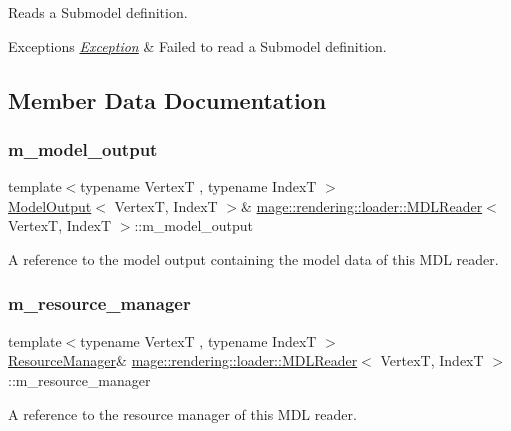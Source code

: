Reads a Submodel definition.


\begin{DoxyExceptions}{Exceptions}
{\em \mbox{\hyperlink{classmage_1_1_exception}{Exception}}} & Failed to read a Submodel definition. \\
\hline
\end{DoxyExceptions}


\subsection{Member Data Documentation}
\mbox{\label{classmage_1_1rendering_1_1loader_1_1_m_d_l_reader_aab6301fae258aaea1619856000a29e53}} 
\subsubsection{\texorpdfstring{m\+\_\+model\+\_\+output}{m\_model\_output}}
{\footnotesize\ttfamily template$<$typename VertexT , typename IndexT $>$ \\
\mbox{\hyperlink{structmage_1_1rendering_1_1_model_output}{Model\+Output}}$<$ VertexT, IndexT $>$\& \mbox{\hyperlink{classmage_1_1rendering_1_1loader_1_1_m_d_l_reader}{mage\+::rendering\+::loader\+::\+M\+D\+L\+Reader}}$<$ VertexT, IndexT $>$\+::m\+\_\+model\+\_\+output\hspace{0.3cm}{\ttfamily [private]}}

A reference to the model output containing the model data of this M\+DL reader. \mbox{\label{classmage_1_1rendering_1_1loader_1_1_m_d_l_reader_ae1a276e89104344daa25666e4b074643}} 
\subsubsection{\texorpdfstring{m\+\_\+resource\+\_\+manager}{m\_resource\_manager}}
{\footnotesize\ttfamily template$<$typename VertexT , typename IndexT $>$ \\
\mbox{\hyperlink{classmage_1_1rendering_1_1_resource_manager}{Resource\+Manager}}\& \mbox{\hyperlink{classmage_1_1rendering_1_1loader_1_1_m_d_l_reader}{mage\+::rendering\+::loader\+::\+M\+D\+L\+Reader}}$<$ VertexT, IndexT $>$\+::m\+\_\+resource\+\_\+manager\hspace{0.3cm}{\ttfamily [private]}}

A reference to the resource manager of this M\+DL reader. 